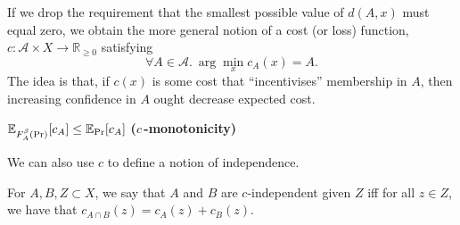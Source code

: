 \documentclass{article}
\begin{document}
If we drop the requirement that the smallest possible value of $d(A,x)$ must equal zero, we obtain the more general notion of a cost (or loss) function, $c :\mathcal A \times X \to \mathbb R_{\ge 0}$ satisfying
\[
\forall A \in \mathcal A.~\arg\min_{x} c_A(x) = A.
\]
The idea is that, if $c(x)$ is some cost that ``incentivises'' membership in $A$, then increasing confidence in $A$ ought decrease expected cost. 
\begin{URaxioms}
    \item $\operatorname*{\mathbb{E}}_{F^{\beta}_A(\Pr)} [ c_A ]
        \le
        \operatorname*{\mathbb{E}}_{\Pr}[ c_A ]
    $
        \hfill \textbf{($c$\,-monotonicity)}
\end{URaxioms}


We can also use $c$ to define a notion of independence.

\begin{defn}[$c$-independence]
For $A,B,Z \subset X$,
we say that $A$ and $B$ are $c$-independent given $Z$ iff
for all $z \in Z$, we have that
$c_{A\cap B}(z) = c_{A}(z) + c_{B}(z)$.
\end{defn}
\end{document}
